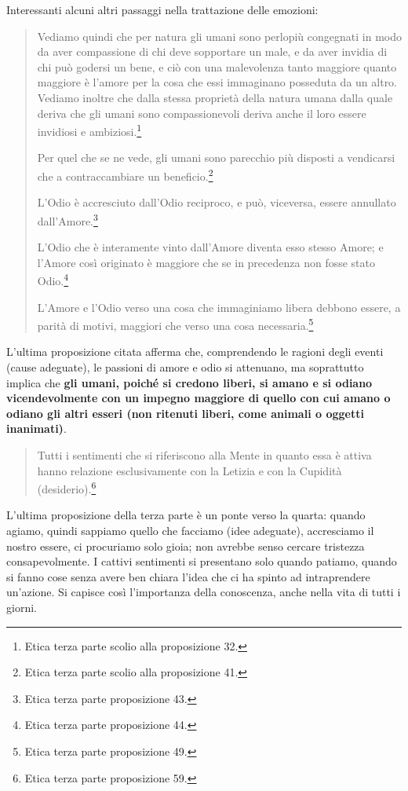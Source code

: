 Interessanti alcuni altri passaggi nella trattazione delle emozioni:

\begin{quotation}
	\small Vediamo quindi che per natura gli umani sono perlopiù congegnati in modo da aver compassione di chi deve sopportare un male, e da aver invidia di chi può godersi
	un bene, e ciò con una malevolenza tanto maggiore quanto maggiore è
	l’amore per la cosa che essi immaginano posseduta da un altro. Vediamo inoltre che dalla
	stessa proprietà della natura umana dalla quale deriva che gli umani sono compassionevoli
	deriva anche il loro essere invidiosi e ambiziosi.\footnote{Etica terza parte scolio alla proposizione 32.}
	
 Per quel che se ne vede, gli umani
	sono parecchio più disposti a vendicarsi che a contraccambiare un beneficio.\footnote{Etica terza parte scolio alla proposizione 41.}
	
	L’Odio è accresciuto dall’Odio reciproco, e può, viceversa, essere annullato dall’Amore.\footnote{Etica terza parte proposizione 43.}
	
	L’Odio che è interamente vinto dall’Amore diventa esso stesso Amore; e l’Amore così originato è maggiore che se in precedenza non fosse stato Odio.\footnote{Etica terza parte proposizione 44.}
	
	L’Amore e l’Odio verso una cosa che immaginiamo libera debbono essere, a parità di motivi, maggiori che verso una cosa necessaria.\footnote{Etica terza parte proposizione 49.}
\end{quotation}

L'ultima proposizione citata afferma che, comprendendo le ragioni degli eventi (cause adeguate), le passioni di amore e odio si attenuano, ma soprattutto implica che \textbf{gli umani, poiché si credono liberi, si amano e si odiano vicendevolmente con un impegno maggiore di quello con cui amano o odiano gli altri esseri (non ritenuti liberi, come animali o oggetti inanimati)}.

\begin{quotation}
	\small Tutti i sentimenti che si riferiscono alla Mente in quanto essa è attiva hanno relazione
	esclusivamente con la Letizia e con la Cupidità (desiderio).\footnote{Etica terza parte proposizione 59.}
\end{quotation}

L'ultima proposizione della terza parte è un ponte verso la quarta: quando agiamo, quindi sappiamo quello che facciamo (idee adeguate), accresciamo il nostro essere, ci procuriamo solo gioia; non avrebbe senso cercare tristezza consapevolmente. I cattivi sentimenti si presentano solo quando patiamo, quando si fanno cose senza avere ben chiara l'idea che ci ha spinto ad intraprendere un'azione. Si capisce così l'importanza della conoscenza, anche nella vita di tutti i giorni.

